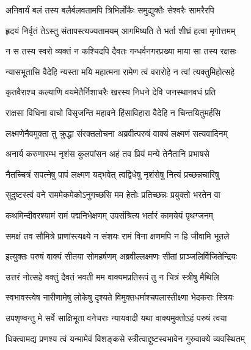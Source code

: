 \twolineshloka
{अनिवार्यं बलं तस्य बलैर्बलवतामपि}
{त्रिभिर्लोकैः समुद्युक्तैः सेश्वरैः सामरैरपि} %

\twolineshloka
{हृदयं निर्वृतं तेऽस्तु संतापस्त्यज्यतामयम्}
{आगमिष्यति ते भर्ता शीघ्रं हत्वा मृगोत्तमम्} %

\twolineshloka
{न स तस्य स्वरो व्यक्तं न कश्चिदपि दैवतः}
{गन्धर्वनगरप्रख्या माया सा तस्य रक्षसः} %

\twolineshloka
{न्यासभूतासि वैदेहि न्यस्ता मयि महात्मना}
{रामेण त्वं वरारोहे न त्वां त्यक्तुमिहोत्सहे} %

\twolineshloka
{कृतवैराश्च कल्याणि वयमेतैर्निशाचरैः}
{खरस्य निधने देवि जनस्थानवधं प्रति} %

\twolineshloka
{राक्षसा विधिना वाचो विसृजन्ति महावने}
{हिंसाविहारा वैदेहि न चिन्तयितुमर्हसि} %

\twolineshloka
{लक्ष्मणेनैवमुक्ता तु क्रुद्धा संरक्तलोचना}
{अब्रवीत्परुषं वाक्यं लक्ष्मणं सत्यवादिनम्} %

\twolineshloka
{अनार्य करुणारम्भ नृशंस कुलपांसन}
{अहं तव प्रियं मन्ये तेनैतानि प्रभाषसे} %

\twolineshloka
{नैतच्चित्रं सपत्नेषु पापं लक्ष्मण यद्भवेत्}
{त्वद्विधेषु नृशंसेषु नित्यं प्रच्छन्नचारिषु} %

\twolineshloka
{सुदुष्टस्त्वं वने राममेकमेकोऽनुगच्छसि}
{मम हेतोः प्रतिच्छन्नः प्रयुक्तो भरतेन वा} %

\twolineshloka
{कथमिन्दीवरश्यामं रामं पद्मनिभेक्षणम्}
{उपसंश्रित्य भर्तारं कामयेयं पृथग्जनम्} %

\twolineshloka
{समक्षं तव सौमित्रे प्राणांस्त्यक्ष्ये न संशयः}
{रामं विना क्षणमपि न हि जीवामि भूतले} %

\twolineshloka
{इत्युक्तः परुषं वाक्यं सीतया सोमहर्षणम्}
{अब्रवील्लक्ष्मणः सीतां प्राञ्जलिर्विजितेन्द्रियः} %

\twolineshloka
{उत्तरं नोत्सहे वक्तुं दैवतं भवती मम}
{वाक्यमप्रतिरूपं तु न चित्रं स्त्रीषु मैथिलि} %

\twolineshloka
{स्वभावस्त्वेष नारीणामेषु लोकेषु दृश्यते}
{विमुक्तधर्माश्चपलास्तीक्ष्णा भेदकराः स्त्रियः} %

\twolineshloka
{उपशृण्वन्तु मे सर्वे साक्षिभूता वनेचराः}
{न्यायवादी यथा वाक्यमुक्तोऽहं परुषं त्वया} %

\twolineshloka
{धिक्त्वामद्य प्रणश्य त्वं यन्मामेवं विशङ्कसे}
{स्त्रीत्वाद्दुष्टस्वभावेन गुरुवाक्ये व्यवस्थितम्} %

